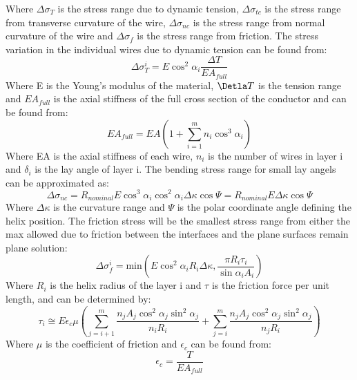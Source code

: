 \noindent Where $\Delta \sigma_T$ is the stress range due to dynamic tension, $\Delta \sigma_{tc}$ is the stress range from transverse curvature of the wire, $\Delta \sigma_{nc}$ is the stress range from normal curvature of the wire and $\Delta \sigma_{f}$ is the stress range from friction. The stress variation in the individual wires due to dynamic tension can be found from:
\begin{equation}
    \Delta \sigma_T^i = E \cos^2 \alpha_i \frac{\Delta T}{E A_{full}} 
\end{equation}
\noindent Where E is the Young's modulus of the material, $\Detla T$ is the tension range and $EA_{full}$  is the axial stiffness of the full cross section of the conductor and can be found from:
\begin{equation}
    EA_{full}=EA \left( 1+\sum_{i=1}^m n_i \cos^3\alpha_i \right)
\end{equation}
\noindent Where EA is the axial stiffness of each wire, $n_i$ is the number of wires in layer i and $\delta_i$ is the lay angle of layer i. \newline
\newline
The bending stress range for small lay angels can be approximated as:
\begin{equation}
    \Delta \sigma_{nc} = R_{nominal} E \cos^3 \alpha_i \cos^2 \alpha_i \Delta \kappa \cos \Psi = R_{nominal}E \Delta \kappa \cos \Psi
\end{equation}
Where $\Delta \kappa$ is the curvature range and $\Psi$ is the polar coordinate angle defining the helix position. \newline
\newline
The friction stress will be the smallest stress range from either the max allowed due to friction between the interfaces and the plane surfaces remain plane solution:
\begin{equation}
    \Delta \sigma_f^i =\text{min}\left(E \cos^2 \alpha_i R_i \Delta \kappa , \frac{\pi R_i \tau_i}{\sin \alpha_i A_i}\right)
\end{equation}
Where $R_i$ is the helix radius of the layer i and $\tau$ is the friction force per unit length, and can be determined by:
\begin{equation}
    \tau_i \cong E \epsilon_c \mu \left( \sum_{j=i+1}^m \frac{n_j A_j \cos^2 \alpha_j \sin^2 \alpha_j }{n_i R_i} + \sum_{j=i}^m \frac{n_j A_j \cos^2 \alpha_j  \sin^2 \alpha_j}{n_j R_i}\right)
\end{equation}
Where $\mu$ is the coefficient of friction and $\epsilon_c$ can be found from:
\begin{equation}
    \epsilon_c =\frac{T}{EA_{full}}
    \label{eq:stressvariation2}
\end{equation}